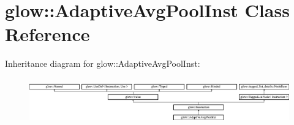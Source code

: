 \hypertarget{classglow_1_1_adaptive_avg_pool_inst}{}\section{glow\+:\+:Adaptive\+Avg\+Pool\+Inst Class Reference}
\label{classglow_1_1_adaptive_avg_pool_inst}
Inheritance diagram for glow\+:\+:Adaptive\+Avg\+Pool\+Inst\+:\begin{figure}[H]
\begin{center}
\leavevmode
\includegraphics[height=1.991111cm]{classglow_1_1_adaptive_avg_pool_inst}
\end{center}
\end{figure}

